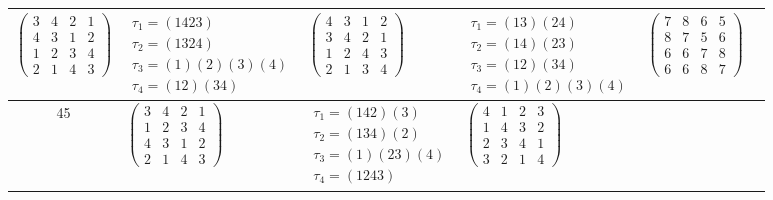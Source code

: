 \begin{longtable}{|c|p{2.7cm}|p{2.7cm}|p{2.7cm}|p{2.7cm}|p{2.7cm}|}
    $\begin{pmatrix} 3 & 4 & 2 & 1 \\ 4 & 3 & 1 & 2 \\ 1 & 2 & 3 & 4 \\ 2 & 1 & 4 & 3 \end{pmatrix}$               &
    $\begin{array}{l}\tau_{1}=(1423)\\ \tau_{2}=(1324)\\ \tau_{3}=(1)(2)(3)(4)\\ \tau_{4}=(12)(34)\end{array}$     &
    $\begin{pmatrix} 4 & 3 & 1 & 2 \\ 3 & 4 & 2 & 1 \\ 1 & 2 & 4 & 3 \\ 2 & 1 & 3 & 4 \end{pmatrix}$               &
    $\begin{array}{l}\tau_{1}=(13)(24)\\ \tau_{2}=(14)(23)\\ \tau_{3}=(12)(34)\\ \tau_{4}=(1)(2)(3)(4)\end{array}$ &
    $\begin{pmatrix} 7 & 8 & 6 & 5 \\ 8 & 7 & 5 & 6 \\ 6 & 6 & 7 & 8 \\ 6 & 6 & 8 & 7 \end{pmatrix}$                                                                                           \\
    \hline
    45                                                                                                             &
    $\begin{pmatrix} 3 & 4 & 2 & 1 \\ 1 & 2 & 3 & 4 \\ 4 & 3 & 1 & 2 \\ 2 & 1 & 4 & 3 \end{pmatrix}$               &
    $\begin{array}{l}\tau_{1}=(142)(3)\\ \tau_{2}=(134)(2)\\ \tau_{3}=(1)(23)(4)\\ \tau_{4}=(1243)\end{array}$     &
    $\begin{pmatrix} 4 & 1 & 2 & 3 \\ 1 & 4 & 3 & 2 \\ 2 & 3 & 4 & 1 \\ 3 & 2 & 1 & 4 \end{pmatrix}$               &

\end{longtable}

